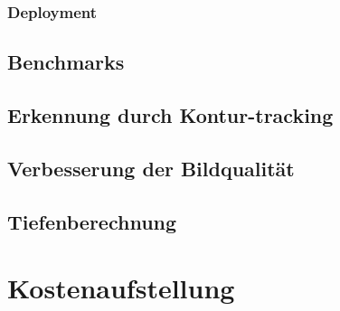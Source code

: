 \subsubsection{Deployment}

\subsection{Benchmarks} \label{cap:Benchmarks}

\subsection{Erkennung durch Kontur-tracking}

\subsection{Verbesserung der Bildqualität}

\subsection{Tiefenberechnung}

\section{Kostenaufstellung}

